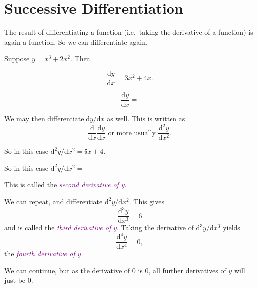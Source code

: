 \documentclass[
  english,
  11pt,
  oneside]{book}
\newcommand{\slide}{}
\theoremstyle{definition}
\theoremstyle{definition}
\theoremstyle{definition}
\theoremstyle{definition}
\theoremstyle{remark}
\begin{document}
\section{Successive Differentiation}\label{lecture-seven}

The result of differentiating a function (i.e.~taking the derivative of a function) is again a function. So we can differentiate again.

Suppose \(y = x^3 + 2x^2\). Then

\begin{notslides}

\[
\frac{\mathrm{d} y}{\mathrm{d} x} = 3x^2 + 4x.
\]

\end{notslides}

\begin{slidesonly}

\[
\frac{\mathrm{d} y}{\mathrm{d} x} = 
\]

\end{slidesonly}

We may then differentiate \(\mathrm{d}y/\mathrm{d} x\) as well. This is written as
\[
\frac{\mathrm{d}}{\mathrm{d} x}\frac{\mathrm{d} y}{\mathrm{d} x}\text{ or more usually }\frac{\mathrm{d}^{2}y}{\mathrm{d} x^2}.
\]

\begin{notslides}

So in this case \(\mathrm{d}^{2}y/\mathrm{d} x^2 = 6x+4\).

\end{notslides}

\begin{slidesonly}

So in this case \(\mathrm{d}^{2}y/\mathrm{d} x^2 =\)

\end{slidesonly}

This is called the \textcolor{purple}{\em second derivative of $y$}.

\slide

We can repeat, and differentiate \(\mathrm{d}^{2}y/\mathrm{d} x^2\). This gives
\[
\frac{\mathrm{d}^{3}y}{\mathrm{d} x^{3}} = 6
\]
and is called the \textcolor{purple}{\em third derivative of $y$}. Taking the derivative of \(\mathrm{d}^{3}y/\mathrm{d} x^{3}\) yields
\[
\frac{\mathrm{d}^{4}y}{\mathrm{d} x^{4}} = 0,
\]
the \textcolor{purple}{\em fourth derivative of $y$}.

We can continue, but as the derivative of \(0\) is \(0\), all further derivatives of \(y\) will just be \(0\).
\slide
\end{document}
